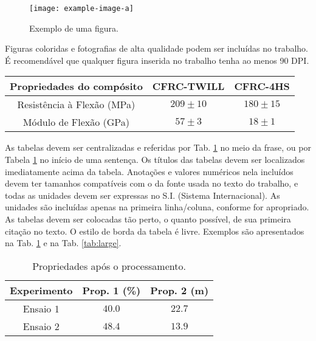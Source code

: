 \documentclass[
	article,			%
	10pt,				%
	oneside,			%
	a4paper,			%
  twocolumn,			%
	english,			%
	brazil,				%
	sumario=tradicional,
	]{abntex2}
\begin{document}
\begin{figure}[h]
  \begin{center}
    \texttt{[image: example-image-a]}
  \end{center}
  \caption{Exemplo de uma figura.}
  \label{fig:example}
\end{figure}

Figuras coloridas e fotografias de alta qualidade podem ser incluídas no trabalho. É
recomendável que qualquer figura inserida no trabalho tenha ao menos 90 DPI.

\begin{table*}[t]
  \caption{Resultados experimentais para as propriedades de flexão dos materiais MAT1 and
  MAT2. Valores médios de obtidos em 20 ensaios.}
  \label{tab:large}
  \centering
  \begin{tabular}{ccc}
    \toprule
    Propriedades do compósito & CFRC-TWILL & CFRC-4HS \\
    \midrule
    Resistência à Flexão (MPa) & $209\pm10$ & $180\pm15$ \\
    Módulo de Flexão (GPa) & $57\pm3$ & $18\pm1$ \\
    \bottomrule
  \end{tabular}
\end{table*}

As tabelas devem ser centralizadas e referidas por Tab. \ref{tab:example} no meio da
frase, ou por Tabela \ref{tab:example} no início de uma sentença. Os títulos das tabelas
devem ser localizados imediatamente acima da tabela. Anotações e valores numéricos nela
incluídos devem ter tamanhos compatíveis com o da fonte usada no texto do trabalho, e
todas as unidades devem ser expressas no S.I. (Sistema Internacional). As unidades são
incluídas apenas na primeira linha/coluna, conforme for apropriado. As tabelas devem ser
colocadas tão perto, o quanto possível, de sua primeira citação no texto. O estilo de
borda da tabela é livre. Exemplos são apresentados na Tab. \ref{tab:example} e na Tab.
\ref{tab:large}.

\begin{table}[h]
  \caption{Propriedades após o processamento.}
  \label{tab:example}
  \centering
  \begin{tabular}{ccc}
    \toprule
    Experimento & Prop. 1 (\%) & Prop. 2 (m)\\
    \midrule
    Ensaio 1 & $40.0$ & $22.7$ \\
    Ensaio 2 & $48.4$ & $13.9$ \\
    \bottomrule
  \end{tabular}
\end{table}
\end{document}
